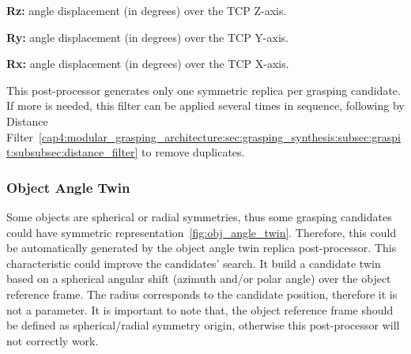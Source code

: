 \begin{itemize_jp}
    \item \textbf{Rz:} angle displacement (in degrees) over the TCP Z-axis.
    \item \textbf{Ry:} angle displacement (in degrees) over the TCP Y-axis.
    \item \textbf{Rx:} angle displacement (in degrees) over the TCP X-axis.
\end{itemize_jp}

This post-processor generates only one symmetric replica per grasping candidate. If more is needed, this filter can be applied several times in sequence, following by Distance Filter~\ref{cap4:modular_grasping_architecture:sec:grasping_synthesis:subsec:graspit:subsubsec:distance_filter} to remove duplicates.

\subsubsection{Object Angle Twin}
\label{cap4:modular_grasping_architecture:sec:grasping_synthesis:subsec:postprocessor:subsubsec:obj_angle_twin}

Some objects are spherical or radial symmetries, thus some grasping candidates could have symmetric representation~\ref{fig:obj_angle_twin}. Therefore, this could be automatically generated by the object angle twin replica post-processor. This characteristic could improve the candidates' search. It build a candidate twin based on a spherical angular shift (azimuth and/or polar angle) over the object reference frame. The radius corresponds to the candidate position, therefore it is not a parameter. It is important to note that, the object reference frame should be defined as spherical/radial symmetry origin, otherwise this post-processor will not correctly work.

\begin{figure}[h!]
\end{figure}

